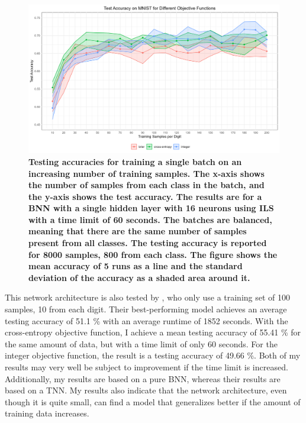 \begin{figure}[!tb]
    \centering
    \includegraphics[width=1\linewidth]{Figures/SBT_COF.png}
    \caption{\small{\textbf{Testing accuracies for training a single batch on an increasing number of training samples. The x-axis shows the number of samples from each class in the batch, and the y-axis shows the test accuracy. The results are for a BNN with a single hidden layer with 16 neurons using ILS with a time limit of 60 seconds. The batches are balanced, meaning that there are the same number of samples present from all classes. The testing accuracy is reported for 8000 samples, 800 from each class. The figure shows the mean accuracy of 5 runs as a line and the standard deviation of the accuracy as a shaded area around it.}} }
    \label{SBT_COF}
\end{figure}

\noindent This network architecture is also tested by \cite{thorbjarnason2023}, who only use a training set of 100 samples, 10 from each digit. Their best-performing model achieves an average testing accuracy of 51.1 \% with an average runtime of 1852 seconds. With the cross-entropy objective function, I achieve a mean testing accuracy of 55.41 \% for the same amount of data, but with a time limit of only 60 seconds. For the integer objective function, the result is a testing accuracy of 49.66 \%. Both of my results may very well be subject to improvement if the time limit is increased. Additionally, my results are based on a pure BNN, whereas their results are based on a TNN. My results also indicate that the network architecture, even though it is quite small, can find a model that generalizes better if the amount of training data increases. 




